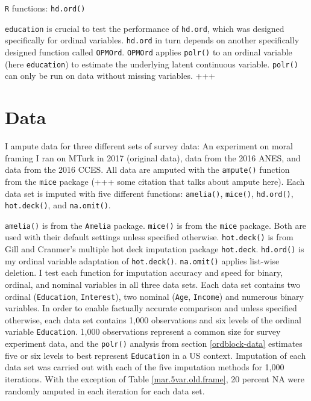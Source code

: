 \documentclass[12pt,econ]{sources/authesis}
\begin{document}
\texttt{R} functions: \texttt{hd.ord()}

\texttt{education} is crucial to test the performance of \texttt{hd.ord}, which was designed specifically for ordinal variables. \texttt{hd.ord} in turn depends on another specifically designed function called \texttt{OPMOrd}. \texttt{OPMOrd} applies \texttt{polr()} to an ordinal variable (here \texttt{education}) to estimate the underlying latent continuous variable. \texttt{polr()} can only be run on data without missing variables. +++

\hypertarget{ordmiss-data}{%
\section{Data}\label{ordmiss-data}}

I ampute data for three different sets of survey data: An experiment on moral framing I ran on MTurk in 2017 (original data), data from the 2016 ANES, and data from the 2016 CCES. All data are amputed with the \texttt{ampute()} function from the \texttt{mice} package (+++ some citation that talks about ampute here). Each data set is imputed with five different functions: \texttt{amelia()}, \texttt{mice()}, \texttt{hd.ord()}, \texttt{hot.deck()}, and \texttt{na.omit()}.

\texttt{amelia()} is from the \texttt{Amelia} package. \texttt{mice()} is from the \texttt{mice} package. Both are used with their default settings unless specified otherwise. \texttt{hot.deck()} is from Gill and Cranmer's multiple hot deck imputation package \texttt{hot.deck}. \texttt{hd.ord()} is my ordinal variable adaptation of \texttt{hot.deck()}. \texttt{na.omit()} applies list-wise deletion. I test each function for imputation accuracy and speed for binary, ordinal, and nominal variables in all three data sets. Each data set contains two ordinal (\texttt{Education}, \texttt{Interest}), two nominal (\texttt{Age}, \texttt{Income}) and numerous binary variables. In order to enable factually accurate comparison and unless specified otherwise, each data set contains 1,000 observations and six levels of the ordinal variable \texttt{Education}. 1,000 observations represent a common size for survey experiment data, and the \texttt{polr()} analysis from section \ref{ordblock-data} estimates five or six levels to best represent \texttt{Education} in a US context. Imputation of each data set was carried out with each of the five imputation methods for 1,000 iterations. With the exception of Table \ref{mar.5var.old.frame}, 20 percent NA were randomly amputed in each iteration for each data set.
\end{document}
